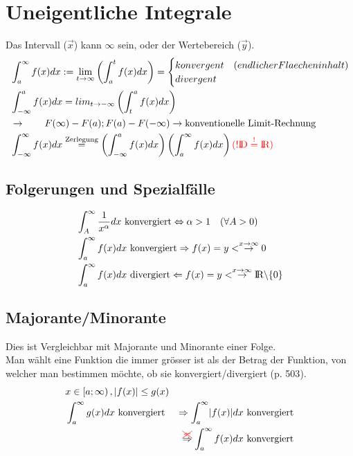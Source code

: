 \section{Uneigentliche Integrale}
Das Intervall ($\vec{x}$) kann $\infty$ sein, oder der Wertebereich ($\vec{y}$).
\begin{align*}
&\int_a^\infty f(x)dx:=\lim_{t\rightarrow\infty}\left(\int_a^t f(x)dx\right) = 
	\begin{cases} 
		 konvergent & (endlicher Flaecheninhalt)\\
		divergent
	\end{cases}
	\\
	&\int_{-\infty}^{a}f(x)dx = lim_{t\rightarrow-\infty}\left(\int_t^af(x)dx\right)\\
	&\rightarrow\qquad F(\infty)-F(a);F(a)-F(-\infty) \rightarrow \text{konventionelle Limit-Rechnung}\\
	&\int^\infty_{-\infty}f(x)dx\stackrel{\text{Zerlegung}}{=}\left(\int^a_{-\infty}f(x)dx\right)\left(\int^\infty_af(x)dx\right) \color{red}{(! \text{\rmfamily I\!D}\stackrel{!}{=}\text{\rmfamily I\!R})}
\end{align*}
\subsection{Folgerungen und Spezialfälle}
\begin{align*}
&\int^\infty_A \frac{1}{x^\alpha}dx \text{ konvergiert} \Leftrightarrow\alpha>1\quad(\forall A>0)\\
&\int^\infty_af(x)dx \text{ konvergiert} \Rightarrow f(x)=y< \stackrel{x\rightarrow\infty}{\rightarrow}0 \\
&\int^\infty_af(x)dx \text{ divergiert} \Leftarrow f(x)=y< \stackrel{x\rightarrow\infty}{\rightarrow}\text{\rmfamily I\!R}\backslash \{0\} 
\end{align*}
\subsection{Majorante/Minorante}
Dies ist Vergleichbar mit Majorante und Minorante einer Folge.\\
Man wählt eine Funktion die immer grösser ist als der Betrag der Funktion, von welcher man bestimmen möchte, ob sie konvergiert/divergiert ({\color{red}p. 503}).
\begin{align*}
& x \in\left[a;\infty\right),\lvert f(x)\rvert \leq g(x)\\
&\int^\infty_a g(x)dx \text{ konvergiert}&\Rightarrow\int^\infty_a \lvert f(x)\rvert dx \text{ konvergiert}\\
&&\stackrel{{\color{red}\xcancel{\Leftarrow}}}{\Rightarrow}\int^\infty_af(x)dx \text{ konvergiert}
\end{align*}

